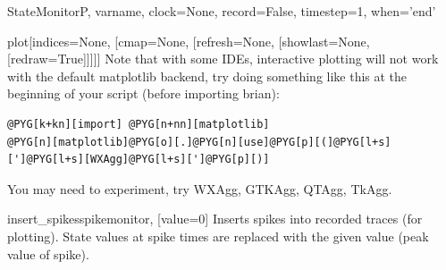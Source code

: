 \documentclass[letterpaper,10pt,english]{manual}
\begin{document}
\begin{classdesc}{StateMonitor}{P, varname, clock=None, record=False, timestep=1, when='end'}
\begin{methoddesc}{plot}{{[}indices=None, {[}cmap=None, {[}refresh=None, {[}showlast=None, {[}redraw=True{]}{]}{]}{]}{]}}
Note that with some IDEs, interactive plotting will not work with the
default matplotlib backend, try doing something like this at the
beginning of your script (before importing brian):

\begin{Verbatim}[commandchars=@\[\]]
@PYG[k+kn][import] @PYG[n+nn][matplotlib]
@PYG[n][matplotlib]@PYG[o][.]@PYG[n][use]@PYG[p][(]@PYG[l+s][']@PYG[l+s][WXAgg]@PYG[l+s][']@PYG[p][)]
\end{Verbatim}

You may need to experiment, try WXAgg, GTKAgg, QTAgg, TkAgg.
\end{methoddesc}

\hypertarget{brian.StateMonitor.insert_spikes}{}\begin{methoddesc}{insert\_spikes}{spikemonitor, {[}value=0{]}}
Inserts spikes into recorded traces (for plotting). State values
at spike times are replaced with the given value (peak value of spike).
\end{methoddesc}
\end{classdesc}
\end{document}
